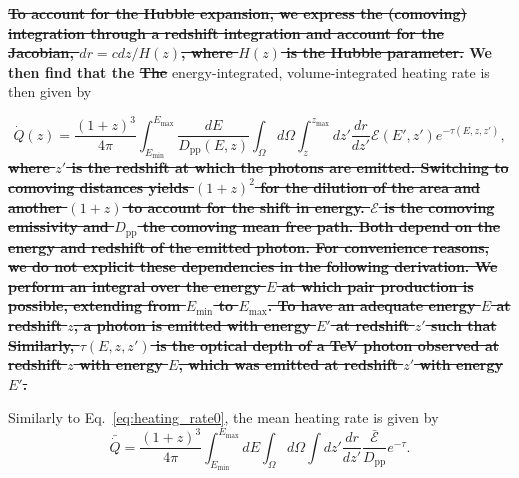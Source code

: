 \documentclass[numberedappendix]{emulateapj}
\newcommand\ALc[1]{{\color{red} \bf #1}} %
\newcommand\Pc[1]{{\color{cyan} \bf #1}} %
\begin{document}
\Pc{\sout{
To account for the Hubble expansion, we express the (comoving) integration through a redshift integration and account for the Jacobian, $dr=c dz /H(z)$, where  $H(z)$ is the Hubble parameter.  } We then find that the \sout{The}} energy-integrated,  volume-integrated heating rate is then given by 
\Pc{
\begin{equation}
  \label{eq:int_exp_heat}
  \dot{Q}(z)=\frac{(1+z)^3}{4\pi }\int_{E_{\mathrm{min}}}^{E_{\mathrm{max}}} \frac{dE}{D_{\mathrm{pp}}(E,z)}\int_{\Omega}d\Omega\int_z^{z_{\mathrm{max}}} dz'\frac{dr}{dz'}\mathcal{E}(E',z') e^{-\tau(E,z,z')},
\end{equation}
\sout{
where $z'$ is the redshift at which the photons are emitted. Switching to comoving distances yields $(1+z)^2$ for the dilution of the area and another $(1+z)$ to account for the shift in energy. $\mathcal{E}$ is the comoving emissivity and $D_{\mathrm{pp}}$ the comoving mean free path.  
Both depend on the energy  and redshift  of the emitted photon. For convenience reasons, we do not explicit these dependencies in the following derivation.  We perform an integral over the energy $E$  at which pair production is possible, extending from $E_{\mathrm{min}}$ to $E_{\mathrm{max}}$. To have an adequate energy $E$ at redshift $z$, a photon is emitted with energy $E'$ at redshift $z'$ such that
}
\sout{Similarly, $\tau(E,z,z')$ is the optical depth of a TeV photon observed at redshift $z$ with energy $E$, which was emitted at redshift $z'$ with energy $E'$.}

}

Similarly to Eq.~\eqref{eq:heating_rate0}, the mean heating rate is given by
\begin{equation}
\label{eq:mean_exp_heat}
\bar{\dot{Q}}=\frac{(1+z)^3}{4\pi}\int_{E_{\mathrm{min}}}^{E_{\mathrm{max}}} dE\int_{\Omega}d\Omega\int dz' \frac{dr}{dz'}\frac{\bar{\mathcal{E}}}{D_{\mathrm{pp}}} e^{-\tau}.
\end{equation}
\end{document}
